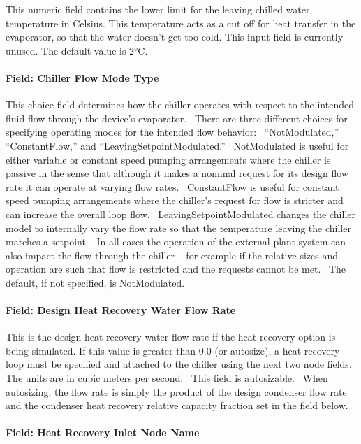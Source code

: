 This numeric field contains the lower limit for the leaving chilled water temperature in Celsius. This temperature acts as a cut off for heat transfer in the evaporator, so that the water doesn't get too cold. This input field is currently unused. The default value is 2°C.

\paragraph{Field: Chiller Flow Mode Type}\label{field-chiller-flow-mode-type}

This choice field determines how the chiller operates with respect to the intended fluid flow through the device's evaporator.~ There are three different choices for specifying operating modes for the intended flow behavior:~ ``NotModulated,'' ``ConstantFlow,'' and ``LeavingSetpointModulated.''~ NotModulated is useful for either variable or constant speed pumping arrangements where the chiller is passive in the sense that although it makes a nominal request for its design flow rate it can operate at varying flow rates.~ ConstantFlow is useful for constant speed pumping arrangements where the chiller's request for flow is stricter and can increase the overall loop flow.~ LeavingSetpointModulated changes the chiller model to internally vary the flow rate so that the temperature leaving the chiller matches a setpoint.~ In all cases the operation of the external plant system can also impact the flow through the chiller -- for example if the relative sizes and operation are such that flow is restricted and the requests cannot be met.~ The default, if not specified, is NotModulated.

\paragraph{Field: Design Heat Recovery Water Flow Rate}\label{field-design-heat-recovery-water-flow-rate-2}

This is the design heat recovery water flow rate if the heat recovery option is being simulated. If this value is greater than 0.0 (or autosize), a heat recovery loop must be specified and attached to the chiller using the next two node fields. The units are in cubic meters per second.~ This field is autosizable.~ When autosizing, the flow rate is simply the product of the design condenser flow rate and the condenser heat recovery relative capacity fraction set in the field below.

\paragraph{Field: Heat Recovery Inlet Node Name}\label{field-heat-recovery-inlet-node-name-2}

